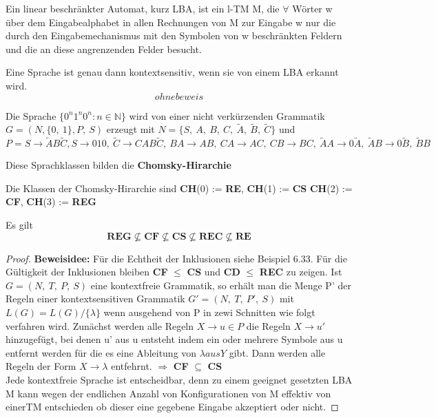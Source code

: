     Ein linear beschränkter Automat, kurz LBA, ist ein l-TM M, die \(\forall\) Wörter w über dem Eingabealphabet in allen Rechnungen von M zur Eingabe w nur die durch den Eingabemechanismus mit den Symbolen von w beschränkten Feldern und die an diese angrenzenden Felder besucht.

    Eine Sprache ist genau dann kontextsensitiv, wenn sie von einem LBA erkannt wird. \[ohne beweis\]

    Die Sprache \(\{0^n1^n0^n : n \in \mathbb{N}\}\) wird von einer nicht verkürzenden Grammatik \(G = (N, \{0,\ 1\}, P,\ S)\) erzeugt mit \(N =\{S,\ A,\ B,\ C,\ \tilde{A},\ \tilde{B},\ \tilde{C}\}\) und 
    \[
        P = S \to \tilde{A} B \tilde{C}, S \to 010,\ \tilde{C} \to CAB \tilde{C},\ BA \to AB,\ CA \to AC,\ CB\to BC,\ \tilde{A}A \to 0\tilde{A},\ \tilde{A}B \to 0\tilde{B},\ \tilde{B}B
    \]

    Diese Sprachklassen bilden die \textbf{Chomsky-Hirarchie}

    Die Klassen der Chomsky-Hirarchie sind \textbf{CH}(0) := \textbf{RE}, \textbf{CH}(1) := \textbf{CS} \textbf{CH}(2) := \textbf{CF}, \textbf{CH}(3) := \textbf{REG}
    
    Es gilt \[\textbf{REG} \not \subseteq \textbf{CF} \not \subseteq \textbf{CS} \not \subseteq\textbf{REC}\not \subseteq \textbf{RE}\]
    \begin{proof}
        \textbf{Beweisidee: } Für die Echtheit der Inklusionen siehe Beispiel 6.33. Für die Gültigkeit der Inklusionen bleiben \textbf{CF} \(\leq\) \textbf{CS} und \textbf{CD} \(\leq\) \textbf{REC} zu zeigen. Ist \(G = (N,\ T,\ P,\ S)\) eine kontextfreie Grammatik, so erhält man die Menge P' der Regeln einer kontextsensitiven Grammatik \(G' = (N,\ T,\ P',\ S)\) mit \(L(G) = L(G)/ \{\lambda\}\) wenn ausgehend von P in zewi Schnitten wie folgt verfahren wird. Zunächst werden alle Regeln \(X \to u \in P\) die Regeln \(X \to u'\) hinzugefügt, bei denen u' aus u entsteht indem ein oder mehrere Symbole aus u entfernt werden für die es eine Ableitung von \(\lambda aus Y\) gibt. Dann werden alle Regeln der Form \(X \to \lambda\) entfehrnt. \(\Rightarrow\) \textbf{CF} \(\subseteq\) \textbf{CS}\\ Jede kontextfreie Sprache ist entscheidbar, denn zu einem geeignet gesetzten LBA M kann wegen der endlichen Anzahl von Konfigurationen von M effektiv von einerTM entschieden ob dieser eine gegebene Eingabe akzeptiert oder nicht.
    \end{proof}

